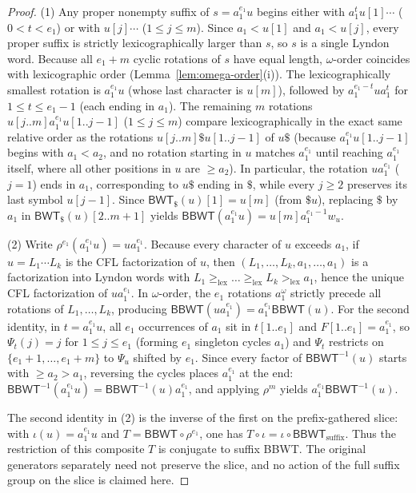 \documentclass[11pt,a4paper]{article}
\theoremstyle{definition}
\newcommand{\BBWT}{\mathsf{BBWT}}
\newcommand{\BWT}{\mathsf{BWT}}
\newcommand{\lex}{\mathrm{lex}}
\begin{document}
\begin{proof}
(1) Any proper nonempty suffix of $s = a_1^{e_1} u$ begins either with $a_1^t u[1]\cdots$ ($0 < t < e_1$) or with $u[j]\cdots$ ($1 \le j \le m$). Since $a_1 < u[1]$ and $a_1 < u[j]$, every proper suffix is strictly lexicographically larger than $s$, so $s$ is a single Lyndon word. Because all $e_1 + m$ cyclic rotations of $s$ have equal length, $\omega$-order coincides with lexicographic order (Lemma~\ref{lem:omega-order}(i)). The lexicographically smallest rotation is $a_1^{e_1} u$ (whose last character is $u[m]$), followed by $a_1^{e_1 - t} u a_1^t$ for $1 \le t \le e_1 - 1$ (each ending in $a_1$). The remaining $m$ rotations $u[j..m] a_1^{e_1} u[1..j-1]$ ($1 \le j \le m$) compare lexicographically in the exact same relative order as the rotations $u[j..m] \$ u[1..j-1]$ of $u\$$ (because $a_1^{e_1} u[1..j-1]$ begins with $a_1 < a_2$, and no rotation starting in $u$ matches $a_1^{e_1}$ until reaching $a_1^{e_1}$ itself, where all other positions in $u$ are $\ge a_2$). In particular, the rotation $u a_1^{e_1}$ ($j = 1$) ends in $a_1$, corresponding to $u\$$ ending in $\$$, while every $j \ge 2$ preserves its last symbol $u[j-1]$. Since $\BWT_{\$}(u)[1] = u[m]$ (from $\$ u$), replacing $\$$ by $a_1$ in $\BWT_{\$}(u)[2..m+1]$ yields $\BBWT(a_1^{e_1} u) = u[m] a_1^{e_1 - 1} w_u$.

(2) Write $\rho^{e_1}(a_1^{e_1} u) = u a_1^{e_1}$. Because every character of $u$ exceeds $a_1$, if $u = L_1 \cdots L_k$ is the CFL factorization of $u$, then $(L_1, \dots, L_k, a_1, \dots, a_1)$ is a factorization into Lyndon words with $L_1 \ge_{\lex} \dots \ge_{\lex} L_k >_{\lex} a_1$, hence the unique CFL factorization of $u a_1^{e_1}$. In $\omega$-order, the $e_1$ rotations $a_1^\omega$ strictly precede all rotations of $L_1, \dots, L_k$, producing $\BBWT(u a_1^{e_1}) = a_1^{e_1} \BBWT(u)$. For the second identity, in $t = a_1^{e_1} u$, all $e_1$ occurrences of $a_1$ sit in $t[1..e_1]$ and $F[1..e_1] = a_1^{e_1}$, so $\Psi_t(j) = j$ for $1 \le j \le e_1$ (forming $e_1$ singleton cycles $a_1$) and $\Psi_t$ restricts on $\{e_1+1,\dots,e_1+m\}$ to $\Psi_u$ shifted by $e_1$. Since every factor of $\BBWT^{-1}(u)$ starts with $\ge a_2 > a_1$, reversing the cycles places $a_1^{e_1}$ at the end: $\BBWT^{-1}(a_1^{e_1} u) = \BBWT^{-1}(u) a_1^{e_1}$, and applying $\rho^m$ yields $a_1^{e_1} \BBWT^{-1}(u)$.

The second identity in (2) is the inverse of the first on the prefix-gathered slice: with $\iota(u)=a_1^{e_1}u$ and $T=\BBWT\circ\rho^{e_1}$, one has $T\circ\iota=\iota\circ\BBWT_{\mathrm{suffix}}$. Thus the restriction of this composite $T$ is conjugate to suffix BBWT. The original generators separately need not preserve the slice, and no action of the full suffix group on the slice is claimed here.


\end{proof}
\end{document}
